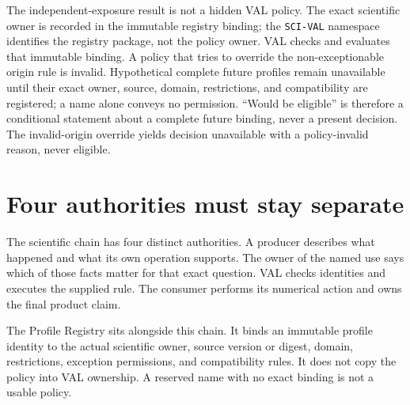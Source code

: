 \documentclass[10pt]{article}
\begin{document}
The independent-exposure result is not a hidden VAL policy. The exact
scientific owner is recorded in the immutable registry binding; the
\texttt{SCI-VAL} namespace identifies the registry package, not the policy
owner. VAL checks and evaluates that immutable binding. A policy that tries
to override the non-exceptionable origin rule is invalid. Hypothetical complete
future profiles remain unavailable until their exact owner,
source, domain, restrictions, and compatibility are registered; a name alone
conveys no permission. ``Would be eligible'' is therefore a conditional
statement about a complete future binding, never a present decision. The
invalid-origin override yields decision
unavailable with a policy-invalid reason, never eligible.

\clearpage
\section{Four authorities must stay separate}
\label{sec:rat-authority}

The scientific chain has four distinct authorities. A producer describes what
happened and what its own operation supports. The owner of the named use says
which of those facts matter for that exact question. VAL checks identities and
executes the supplied rule. The consumer performs its numerical action and
owns the final product claim.

\begin{center}
\end{center}

The Profile Registry sits alongside this chain. It binds an immutable profile
identity to the actual scientific owner, source version or digest, domain,
restrictions, exception permissions, and compatibility rules. It does not
copy the policy into VAL ownership. A reserved name with no exact binding is
not a usable policy.
\end{document}
